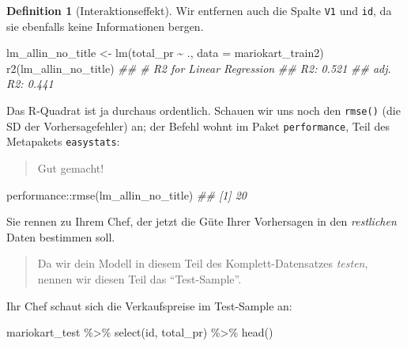 \documentclass[
  letterpaper,
]{scrbook}
\newenvironment{Shaded}{\begin{snugshade}}{\end{snugshade}}
\newcommand{\AttributeTok}[1]{\textcolor[rgb]{0.40,0.45,0.13}{#1}}
\newcommand{\DocumentationTok}[1]{\textcolor[rgb]{0.37,0.37,0.37}{\textit{#1}}}
\newcommand{\FunctionTok}[1]{\textcolor[rgb]{0.28,0.35,0.67}{#1}}
\newcommand{\NormalTok}[1]{\textcolor[rgb]{0.00,0.23,0.31}{#1}}
\newcommand{\OtherTok}[1]{\textcolor[rgb]{0.00,0.23,0.31}{#1}}
\newcommand{\SpecialCharTok}[1]{\textcolor[rgb]{0.37,0.37,0.37}{#1}}
\theoremstyle{definition}
\theoremstyle{definition}
\theoremstyle{definition}
\newtheorem{definition}{Definition}[chapter]
\theoremstyle{remark}
\begin{document}
\begin{definition}[Interaktionseffekt]
Wir entfernen auch die Spalte \texttt{V1} und \texttt{id}, da sie
ebenfalls keine Informationen bergen.

\begin{Shaded}
\begin{Highlighting}[]
\NormalTok{lm\_allin\_no\_title }\OtherTok{\textless{}{-}} \FunctionTok{lm}\NormalTok{(total\_pr }\SpecialCharTok{\textasciitilde{}}\NormalTok{ ., }\AttributeTok{data =}\NormalTok{ mariokart\_train2)}
\FunctionTok{r2}\NormalTok{(lm\_allin\_no\_title) }
\DocumentationTok{\#\# \# R2 for Linear Regression}
\DocumentationTok{\#\#        R2: 0.521}
\DocumentationTok{\#\#   adj. R2: 0.441}
\end{Highlighting}
\end{Shaded}

Das R-Quadrat ist ja durchaus ordentlich. Schauen wir uns noch den
\texttt{rmse()} (die SD der Vorhersagefehler) an; der Befehl wohnt im
Paket \texttt{performance}, Teil des Metapakets \texttt{easystats}:

\begin{quote}
{} Gut gemacht!
\end{quote}

\begin{Shaded}
\begin{Highlighting}[]
\NormalTok{performance}\SpecialCharTok{::}\FunctionTok{rmse}\NormalTok{(lm\_allin\_no\_title)}
\DocumentationTok{\#\# [1] 20}
\end{Highlighting}
\end{Shaded}

Sie rennen zu Ihrem Chef, der jetzt die Güte Ihrer Vorhersagen in den
\emph{restlichen} Daten bestimmen soll.

\begin{quote}
{} Da wir dein Modell in diesem Teil des
Komplett-Datensatzes \emph{testen}, nennen wir diesen Teil das
\enquote{Test-Sample}.
\end{quote}

Ihr Chef schaut sich die Verkaufspreise im Test-Sample an:

\begin{Shaded}
\begin{Highlighting}[]
\NormalTok{mariokart\_test }\SpecialCharTok{\%\textgreater{}\%} 
  \FunctionTok{select}\NormalTok{(id, total\_pr) }\SpecialCharTok{\%\textgreater{}\%} 
  \FunctionTok{head}\NormalTok{()}
\end{Highlighting}
\end{Shaded}


\end{definition}
\end{document}
